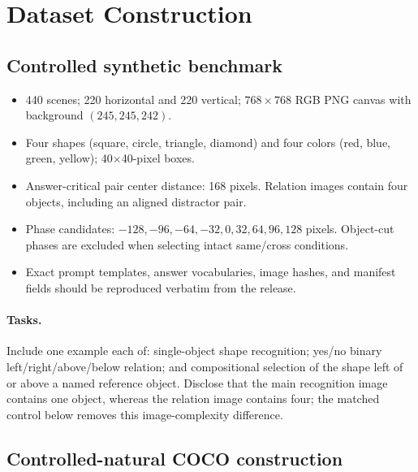 \documentclass[10pt,twocolumn,letterpaper]{article}
\begin{document}
\section{Dataset Construction}

\subsection{Controlled synthetic benchmark}

\begin{itemize}[leftmargin=*]
    \item 440 scenes; 220 horizontal and 220 vertical; $768\times768$ RGB PNG canvas with background $(245,245,242)$.
    \item Four shapes (square, circle, triangle, diamond) and four colors (red, blue, green, yellow); 40$\times$40-pixel boxes.
    \item Answer-critical pair center distance: 168 pixels.  Relation images contain four objects, including an aligned distractor pair.
    \item Phase candidates: $-128,-96,-64,-32,0,32,64,96,128$ pixels.  Object-cut phases are excluded when selecting intact same/cross conditions.
    \item Exact prompt templates, answer vocabularies, image hashes, and manifest fields should be reproduced verbatim from the release.
\end{itemize}

\paragraph{Tasks.}
Include one example each of: single-object shape recognition; yes/no binary left/right/above/below relation; and compositional selection of the shape left of or above a named reference object.
Disclose that the main recognition image contains one object, whereas the relation image contains four; the matched control below removes this image-complexity difference.

\subsection{Controlled-natural COCO construction}
\end{document}
